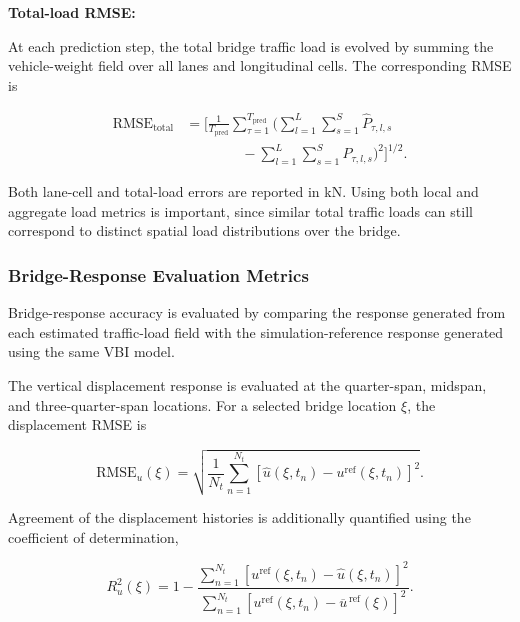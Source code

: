 \documentclass[journal]{IEEEtran}
\begin{document}
\textbf{Total-load RMSE:}

At
each prediction step, the total bridge traffic load is evolved by summing the
vehicle-weight field over all lanes and longitudinal cells. The corresponding
RMSE is

\begin{equation}
\begin{aligned}
\mathrm{RMSE}_{\mathrm{total}}
&=
\Bigg[
\frac{1}{T_{\mathrm{pred}}}
\sum_{\tau=1}^{T_{\mathrm{pred}}}
\Bigg(
\sum_{l=1}^{L}
\sum_{s=1}^{S}
\widehat{P}_{\tau,l,s}
\\
&\qquad\qquad
-
\sum_{l=1}^{L}
\sum_{s=1}^{S}
P_{\tau,l,s}
\Bigg)^2
\Bigg]^{1/2}.
\end{aligned}
\end{equation}

Both lane-cell and
total-load errors are reported in kN. Using both local and aggregate load
metrics is important, since similar total traffic loads can still correspond to
distinct spatial load distributions over the bridge.



\subsubsection{Bridge-Response Evaluation Metrics}

Bridge-response
accuracy is evaluated by comparing the response generated from each estimated
traffic-load field with the simulation-reference response generated using the
same VBI model.

The
vertical displacement response is evaluated at the quarter-span, midspan, and
three-quarter-span locations. For a selected bridge location $\xi$, the displacement RMSE
is

\begin{equation}
\mathrm{RMSE}_{u}(\xi)
=
\sqrt{
\frac{1}{N_t}
\sum_{n=1}^{N_t}
\left[
\widehat{u}(\xi,t_n)
-
u^{\mathrm{ref}}(\xi,t_n)
\right]^2
}.
\end{equation}

Agreement
of the displacement histories is additionally quantified using the coefficient
of determination,

\begin{equation}
R_u^2(\xi)
=
1-
\frac{
\displaystyle
\sum_{n=1}^{N_t}
\left[
u^{\mathrm{ref}}(\xi,t_n)
-
\widehat{u}(\xi,t_n)
\right]^2
}{
\displaystyle
\sum_{n=1}^{N_t}
\left[
u^{\mathrm{ref}}(\xi,t_n)
-
\overline{u}^{\,\mathrm{ref}}(\xi)
\right]^2
}.
\end{equation}
\end{document}
